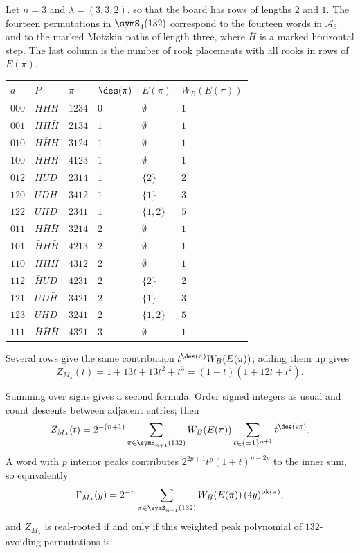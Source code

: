 \begin{example*}[$132$-avoiding permutations for $\lambda=(3,3,2)$]
Let $n=3$ and $\lambda=(3,3,2)$, so that the board has rows of lengths $2$ and
$1$.  The fourteen permutations in $\symS_4(132)$ correspond to the fourteen
words in $\mathcal{A}_3$ and to the marked Motzkin paths of length three, where
$\bar{H}$ is a marked horizontal step.  The last column is the number of
rook placements with all rooks in rows of $E(\pi)$.

\begin{tabular}{llllll}
\toprule
$a$ & $P$ & $\pi$ & $\des(\pi)$ & $E(\pi)$ & $W_B(E(\pi))$ \\
\midrule
$000$ & $HHH$ & $1234$ & $0$ & $\emptyset$ & $1$ \\
$001$ & $HH\bar{H}$ & $2134$ & $1$ & $\emptyset$ & $1$ \\
$010$ & $H\bar{H}H$ & $3124$ & $1$ & $\emptyset$ & $1$ \\
$100$ & $\bar{H}HH$ & $4123$ & $1$ & $\emptyset$ & $1$ \\
$012$ & $HUD$ & $2314$ & $1$ & $\{2\}$ & $2$ \\
$120$ & $UDH$ & $3412$ & $1$ & $\{1\}$ & $3$ \\
$122$ & $UHD$ & $2341$ & $1$ & $\{1,2\}$ & $5$ \\
$011$ & $H\bar{H}\bar{H}$ & $3214$ & $2$ & $\emptyset$ & $1$ \\
$101$ & $\bar{H}H\bar{H}$ & $4213$ & $2$ & $\emptyset$ & $1$ \\
$110$ & $\bar{H}\bar{H}H$ & $4312$ & $2$ & $\emptyset$ & $1$ \\
$112$ & $\bar{H}UD$ & $4231$ & $2$ & $\{2\}$ & $2$ \\
$121$ & $UD\bar{H}$ & $3421$ & $2$ & $\{1\}$ & $3$ \\
$123$ & $U\bar{H}D$ & $3241$ & $2$ & $\{1,2\}$ & $5$ \\
$111$ & $\bar{H}\bar{H}\bar{H}$ & $4321$ & $3$ & $\emptyset$ & $1$ \\
\bottomrule
\end{tabular}

Several rows give the same contribution $t^{\des(\pi)}W_B(E(\pi))$; adding
them up gives
\[
  Z_{M_\lambda}(t)=1+13t+13t^2+t^3=(1+t)(1+12t+t^2).
\]
\end{example*}

Summing over signs gives a second formula.  Order signed integers as usual
and count descents between adjacent entries; then
\[
  Z_{M_\lambda}(t)=2^{-(n+1)}\sum_{\pi\in\symS_{n+1}(132)} W_B(E(\pi))
  \sum_{\epsilon\in\{\pm1\}^{n+1}} t^{\des(\epsilon\pi)}.
\]
A word with $p$ interior peaks contributes $2^{2p+1}t^p(1+t)^{n-2p}$ to the inner
sum, so equivalently
\[
  \Gamma_{M_\lambda}(y)=2^{-n}\sum_{\pi\in\symS_{n+1}(132)}W_B(E(\pi))\,
  (4y)^{\operatorname{pk}(\pi)},
\]
and $Z_{M_\lambda}$ is real-rooted if and only if this weighted peak polynomial
of $132$-avoiding permutations is.

